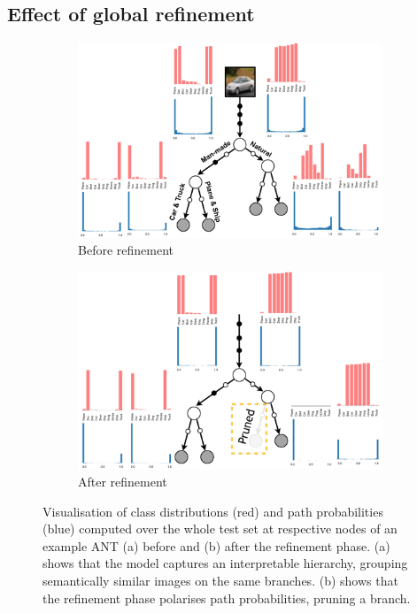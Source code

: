 \subsection{Effect of global refinement} \label{sec:refinement}
\begin{figure}[t!]
	\center
	\begin{subfigure}[t]{0.9\linewidth}
		\includegraphics[width=\linewidth]{chapter_7/figures/fig_7_9.png}
		\vspace{-6mm}
		\caption{Before refinement}
	\end{subfigure}
	\hspace{4.66mm}
	\begin{subfigure}[t]{0.9\linewidth}
		\includegraphics[width=\linewidth]{chapter_7/figures/fig_7_10.png}
		\vspace{-6mm}
		\caption{After refinement}
	\end{subfigure}
	\caption{\small Visualisation of class distributions (red) and path probabilities (blue) computed over the whole test set at respective nodes of an example ANT (a) before and (b) after the refinement phase. (a) shows that the model captures an interpretable hierarchy, grouping semantically similar images on the same branches. (b) shows that the refinement phase polarises path probabilities, pruning a branch.}
	\label{fig:learnedmodel}
\end{figure}


